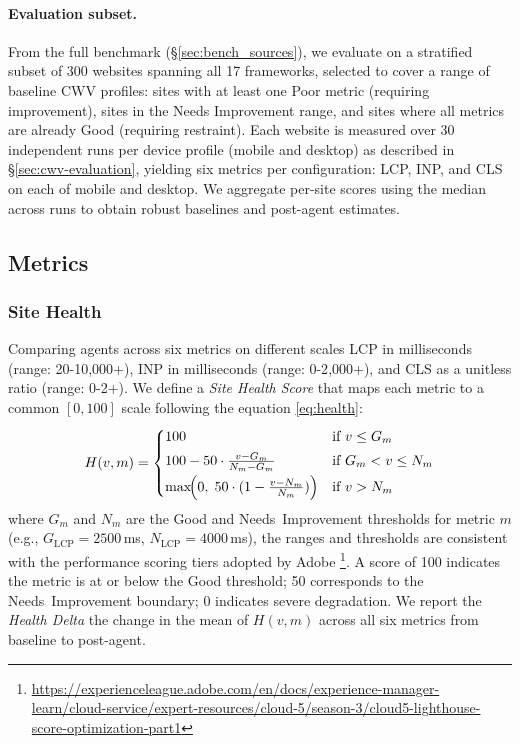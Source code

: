 \paragraph{Evaluation subset.}
From the full benchmark (\S\ref{sec:bench_sources}), we evaluate on a stratified subset of 300 websites spanning all 17 frameworks, selected to cover a range of baseline CWV profiles: sites with at least one Poor metric (requiring improvement), sites in the Needs Improvement range, and sites where all metrics are already Good (requiring restraint).
Each website is measured over 30 independent runs per device profile (mobile and desktop) as described in \S\ref{sec:cwv-evaluation}, yielding six metrics per configuration: LCP, INP, and CLS on each of mobile and desktop.
We aggregate per-site scores using the median across runs to obtain robust baselines and post-agent estimates.


\subsection{Metrics}

\subsubsection{Site Health}
\label{sec:site-health}
Comparing agents across six metrics on different scales LCP in milliseconds (range: 20-10{,}000+), INP in milliseconds (range: 0-2{,}000+), and CLS as a unitless ratio (range: 0-2+). We define a \emph{Site Health Score} that maps each metric to a common $[0,100]$ scale following the equation \ref{eq:health}:
\begin{equation}
\label{eq:health}
    H(v, m) = \begin{cases}
        100 & \text{if } v \leq G_m \\[3pt]
        100 - 50 \cdot \frac{v - G_m}{N_m - G_m} & \text{if } G_m < v \leq N_m \\[3pt]
        \max\!\Bigl(0,\; 50\cdot(1 - \frac{v - N_m}{N_m})\Bigr) & \text{if } v > N_m
    \end{cases}
\end{equation}
where $G_m$ and $N_m$ are the Good and Needs~Improvement thresholds for metric $m$ (e.g., $G_{\text{LCP}}=2500$\,ms, $N_{\text{LCP}}=4000$\,ms), the ranges and thresholds are consistent with the performance scoring tiers adopted by Adobe \footnote{\url{https://experienceleague.adobe.com/en/docs/experience-manager-learn/cloud-service/expert-resources/cloud-5/season-3/cloud5-lighthouse-score-optimization-part1}}. A score of 100 indicates the metric is at or below the Good threshold; 50 corresponds to the Needs~Improvement boundary; 0 indicates severe degradation. We report the \emph{Health Delta} the change in the mean of $H(v,m)$ across all six metrics from baseline to post-agent.